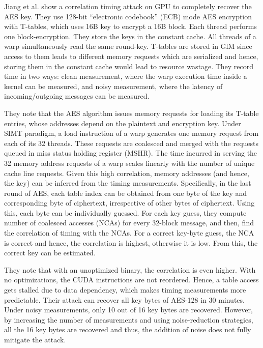  

Jiang et al. \cite{jiang2016complete} show a correlation timing attack on GPU to completely recover the AES key. They use 128-bit ``electronic codebook'' (ECB) mode AES encryption with T-tables, which uses 16B key to encrypt a 16B block. Each thread performs one block-encryption. They store the keys in the constant cache. All threads of a warp simultaneously read the same round-key. T-tables are stored in GlM since access to them leads to different memory requests which are serialized and hence, storing them in the constant cache would lead to resource wastage. They record time in two ways: clean measurement, where the warp execution time inside a kernel can be measured, and noisy measurement, where the latency of incoming/outgoing messages can be measured. 

They note that the AES algorithm issues memory requests for loading its T-table entries, whose addresses depend on the plaintext and encryption key. Under SIMT paradigm, a load instruction of a warp generates one memory request from each of its 32 threads. These requests are coalesced and merged with the requests queued in miss status holding register (MSHR). The time incurred in serving the 32 memory address requests of a warp scales linearly with the number of unique cache line requests. Given this high correlation, memory addresses (and hence, the key) can be inferred from the timing measurements. Specifically, in the last round of AES, each table index can be obtained from one byte of the key and corresponding byte of ciphertext, irrespective of other bytes of ciphertext. Using this, each byte can be individually guessed. For each key guess, they compute number of coalesced accesses (NCAs) for every 32-block message, and then, find the correlation of timing with the NCAs.  For a correct key-byte guess, the NCA is correct and hence, the correlation is highest, otherwise it is low. From this, the correct key can be estimated.  
 

They note that with an unoptimized binary, the correlation is even higher. With no optimizations, the CUDA instructions are not reordered. Hence, a table access gets stalled due to data dependency, which makes timing measurements more predictable. Their attack can recover all key bytes of AES-128 in 30 minutes. Under noisy measurements, only 10 out of 16 key bytes are recovered. However, by increasing the number of measurements and using noise-reduction strategies, all the 16 key bytes are recovered and thus, the addition of noise does not fully mitigate the attack. 

